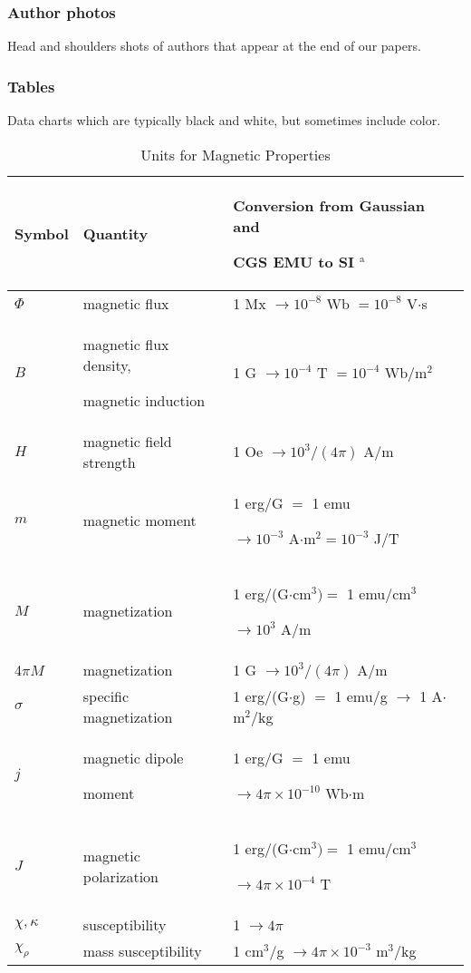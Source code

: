 \documentclass{IEEEtran}
\begin{document}
\subsubsection{Author photos}
{Head and shoulders shots of authors that appear at the end of our papers. }

\subsubsection{Tables}
{Data charts which are typically black and white, but sometimes include 
color.}

\begin{table}
\caption{Units for Magnetic Properties}
\label{table}
\setlength{\tabcolsep}{3pt}
\begin{tabular}{|p{25pt}|p{75pt}|p{115pt}|}
\hline
Symbol& 
Quantity& 
Conversion from Gaussian and \par CGS EMU to SI $^{\mathrm{a}}$ \\
\hline
$\Phi $& 
magnetic flux& 
1 Mx $\to  10^{-8}$ Wb $= 10^{-8}$ V$\cdot $s \\
$B$& 
magnetic flux density, \par magnetic induction& 
1 G $\to  10^{-4}$ T $= 10^{-4}$ Wb/m$^{2}$ \\
$H$& 
magnetic field strength& 
1 Oe $\to  10^{3}/(4\pi )$ A/m \\
$m$& 
magnetic moment& 
1 erg/G $=$ 1 emu \par $\to 10^{-3}$ A$\cdot $m$^{2} = 10^{-3}$ J/T \\
$M$& 
magnetization& 
1 erg/(G$\cdot $cm$^{3}) =$ 1 emu/cm$^{3}$ \par $\to 10^{3}$ A/m \\
4$\pi M$& 
magnetization& 
1 G $\to  10^{3}/(4\pi )$ A/m \\
$\sigma $& 
specific magnetization& 
1 erg/(G$\cdot $g) $=$ 1 emu/g $\to $ 1 A$\cdot $m$^{2}$/kg \\
$j$& 
magnetic dipole \par moment& 
1 erg/G $=$ 1 emu \par $\to 4\pi \times  10^{-10}$ Wb$\cdot $m \\
$J$& 
magnetic polarization& 
1 erg/(G$\cdot $cm$^{3}) =$ 1 emu/cm$^{3}$ \par $\to 4\pi \times  10^{-4}$ T \\
$\chi , \kappa $& 
susceptibility& 
1 $\to  4\pi $ \\
$\chi_{\rho }$& 
mass susceptibility& 
1 cm$^{3}$/g $\to  4\pi \times  10^{-3}$ m$^{3}$/kg \\

\end{tabular}
\end{table}
\end{document}
